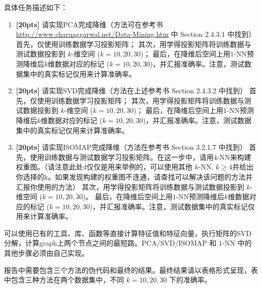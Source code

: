 \documentclass[a4paper,UTF8]{article}
\numberwithin{equation}{section}
\begin{document}
具体任务描述如下：
\begin{enumerate}
	\item \textbf{[20pts]} 请实现PCA完成降维（方法可在参考书\url{http://www.charuaggarwal.net/Data-Mining.htm} 中 Section 2.4.3.1 中找到）
	\subitem 首先，仅使用训练数据学习投影矩阵；
	\subitem 其次，用学得投影矩阵将训练数据与测试数据投影到 $k$-维空间 ($k=10,20,30$)；
	\subitem 最后，在降维后空间上用$1$-NN预测降维后$k$维数据对应的标记 ($k=10,20,30$)，并汇报准确率。注意，测试数据集中的真实标记仅用来计算准确率。
	\item \textbf{[20pts]} 请实现SVD完成降维（方法在上述参考书 Section 2.4.3.2 中找到）
	\subitem 首先，仅使用训练数据学习投影矩阵；
	\subitem 其次，用学得投影矩阵将训练数据与测试数据投影到 $k$-维空间 ($k=10,20,30$)；
	\subitem 最后，在降维后空间上用$1$-NN预测降维后$k$维数据对应的标记 ($k=10,20,30$)，并汇报准确率。注意，测试数据集中的真实标记仅用来计算准确率。
	\item \textbf{[20pts]} 请实现ISOMAP完成降维（方法在参考书 Section 3.2.1.7 中找到）
	\subitem 首先，使用训练数据与测试数据学习投影矩阵。在这一步中，请用$4$-NN来构建权重图。（请注意此处$4$仅仅是用来举例的，可以使用其他 $k$-NN, $k\geq 4$并给出你选择的k。如果发现构建的权重图不连通，请查找可以解决该问题的方法并汇报你使用的方法）
	\subitem 其次，用学得投影矩阵将训练数据与测试数据投影到 $k$-维空间 ($k=10,20,30$)。
	\subitem 最后，在降维后空间上用$1$-NN预测降维后$k$维数据对应的标记 ($k=10,20,30$)，并汇报准确率。注意，测试数据集中的真实标记仅用来计算准确率。
\end{enumerate}

可以使用已有的工具、库、函数等直接计算特征值和特征向量，执行矩阵的SVD分解，计算graph上两个节点之间的最短路。PCA/SVD/ISOMAP 和 $1$-NN 中的其他步骤必须由自己实现。

报告中需要包含三个方法的伪代码和最终的结果。最终结果请以表格形式呈现，表中包含三种方法在两个数据集中，不同 $k=10,20,30$ 下的准确率。
\newpage
\end{document}

